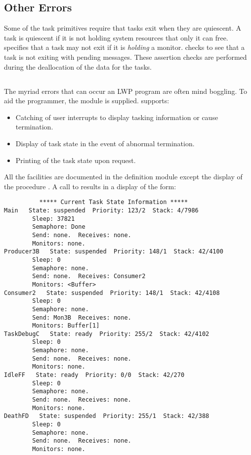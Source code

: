 \subsection{Other Errors}

Some of the task primitives require that tasks exit when they are
quiescent.  A task is quiescent if it is not holding system resources
that only it can free.   specifies that
a task may not exit if it is {\em holding} a monitor.  
 checks to see that a task is not exiting
with pending messages.  These assertion checks are performed during
the deallocation of the  data for the tasks.

\subsection{}

The myriad errors that can occur an LWP program are often mind boggling.
To aid the programmer, the module  is supplied. 
 supports:
\begin{itemize}
\item
    Catching of user interrupts to display tasking information or
    cause termination.
\item
    Display of task state in the event of abnormal termination.
\item
    Printing of the task state upon request.
\end{itemize}

All the facilities are documented in the definition module
except the display of the procedure .
A call to  results in a display of the form:
\begin{verbatim}
          ***** Current Task State Information *****
Main   State: suspended  Priority: 123/2  Stack: 4/7986
        Sleep: 37821
        Semaphore: Done
        Send: none.  Receives: none.
        Monitors: none.
Producer3B   State: suspended  Priority: 148/1  Stack: 42/4100
        Sleep: 0
        Semaphore: none.
        Send: none.  Receives: Consumer2
        Monitors: <Buffer>
Consumer2   State: suspended  Priority: 148/1  Stack: 42/4108
        Sleep: 0
        Semaphore: none.
        Send: Mon3B  Receives: none.
        Monitors: Buffer[1]
TaskDebugC   State: ready  Priority: 255/2  Stack: 42/4102
        Sleep: 0
        Semaphore: none.
        Send: none.  Receives: none.
        Monitors: none.
IdleFF   State: ready  Priority: 0/0  Stack: 42/270
        Sleep: 0
        Semaphore: none.
        Send: none.  Receives: none.
        Monitors: none.
DeathFD   State: suspended  Priority: 255/1  Stack: 42/388
        Sleep: 0
        Semaphore: none.
        Send: none.  Receives: none.
        Monitors: none.
\end{verbatim}

